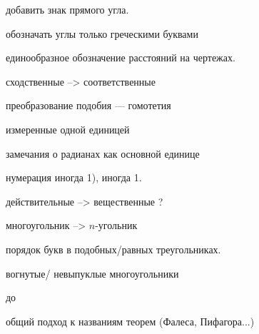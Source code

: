 





добавить знак прямого угла.

обозначать углы только греческими буквами


единообразное обозначение расстояний на чертежах.

сходственные --> соответственные


преобразование подобия --- гомотетия



измеренные одной единицей

замечания о радианах как основной единице



нумерация иногда 1), иногда 1.

действительные --> вещественные ?

многоугольник --> $n$-угольник

порядок букв в подобных/равных треугольниках.

вогнутые/ невыпуклые многоугольники 

\medskip до \so

общий подход к названиям теорем (Фалеса, Пифагора...)